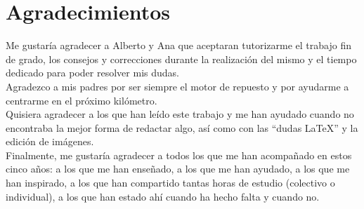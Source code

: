 
\chapter*{Agradecimientos}

Me gustaría agradecer a Alberto y Ana que aceptaran tutorizarme el trabajo fin de grado, los consejos y correcciones durante la realización del mismo y el tiempo dedicado para poder resolver mis dudas.\\

Agradezco a mis padres por ser siempre el motor de repuesto y por ayudarme a centrarme en el próximo kilómetro.\\

Quisiera agradecer a los que han leído este trabajo y me han ayudado cuando no encontraba la mejor forma de redactar algo, así como con las ``dudas \LaTeX'' y la edición de imágenes.\\

Finalmente, me gustaría agradecer a todos los que me han acompañado en estos cinco años: a los que me han enseñado, a los que me han ayudado, a los que  me han inspirado, a los que han compartido tantas horas de estudio (colectivo o individual), a los que han estado ahí cuando ha hecho falta y cuando no. 
